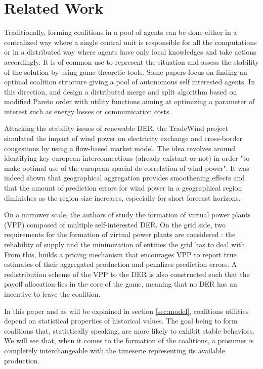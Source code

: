 \documentclass[conference]{IEEEtran}
\begin{document}
\section{Related Work}
\label{sec:related}

Traditionally, forming coalitions in a pool of agents can be done either in a centralized way where a single central unit is responsible for all the computations or in a distributed way where agents have only local knowledges and take actions accordingly. It is of common use to represent the situation and assess the stability of the solution by using game theoretic tools. Some papers focus on finding an optimal coalition structure giving a pool of autonomous self interested agents. In this direction, \cite{Saad2009} and \cite{Luan2014} design a distributed merge and split algorithm based on modified Pareto order with utility functions aiming at optimizing a parameter of interest such as energy losses or communication costs.

Attacking the stability issues of renewable DER, the TradeWind project \cite{Europe} simulated the impact of wind power on electricity exchange and cross-border congestions by using a flow-based market model. The idea revolves around identifying key european interconnections (already existant or not) in order "to make optimal use of the european spacial de-correlation of wind power". It was indeed shown that geographical aggregation provides smoothening effects and that the amount of prediction errors for wind power in a geographical region diminishes as the region size increases, especially for short forecast horizons.

On a narrower scale, the authors of \cite{Kota2011} study the formation of virtual power plants (VPP) composed of multiple self-interested DER. On the grid side, two requirements for the formation of virtual power plants are considered : the reliability of supply and the minimization of entities the grid has to deal with. From this, \cite{Kota2011} builds a pricing mechanism that encourages VPP to report true estimates of their aggregated production and penalizes prediction errors. A redistribution scheme of the VPP to the DER is also constructed such that the payoff allocation lies in the core of the game, meaning that no DER has an incentive to leave the coalition.

In this paper and as will be explained in section \ref{sec:model}, coalitions utilities depend on statistical properties of historical values. The goal being to form coalitions that, statistically speaking, are more likely to exhibit stable behaviors. We will see that, when it comes to the formation of the coalitions, a prosumer is completely interchangeable with the timeserie representing its available production.
\end{document}

